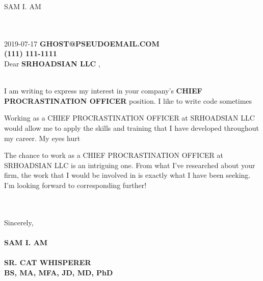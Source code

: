 \documentclass[]{formatting}\usepackage[]{graphicx}\usepackage[]{color}
\begin{document}
\colorbox{mygray}{
\parbox[t]{\linewidth}{
\vspace*{14pt} 
\hfill \color{white} \textsc{\huge 
SAM I. AM
 }
\vspace*{14pt} 
}}
\large{\\ \\
2019-07-17
\hfill 
\textbf{
GHOST@PSEUDOEMAIL.COM
} \\
}
\large{
\vspace*{14pt}
\hfill \color{white} {\textbf{\large
(111) 111-1111
}}
}
\\
\large{Dear \textbf{
SRHOADSIAN LLC
},}
\\
\\
\large{
I am writing to express my interest in your company's \textbf{
CHIEF PROCRASTINATION OFFICER
} position.
I like to write code sometimes
 
    
    Working as a 
CHIEF PROCRASTINATION OFFICER
 at
SRHOADSIAN LLC
 would allow me to apply the skills and training that I have developed throughout my career. 
My eyes hurt

    
    


    
    


    
    The chance to work as a 
CHIEF PROCRASTINATION OFFICER
 at
SRHOADSIAN LLC
 is an intriguing one. From what I’ve researched about your firm, the work that I would be involved in is exactly what I have been seeking. I'm looking forward to corresponding further!
}
\\
\\
\large{Sincerely,}\\
\\
\large{\textbf{
SAM I. AM
}}\\
\\
\small{\textbf{
SR. CAT WHISPERER
}}\\
\small{\textbf{
BS, MA, MFA, JD, MD, PhD
}}\\
\end{document}
